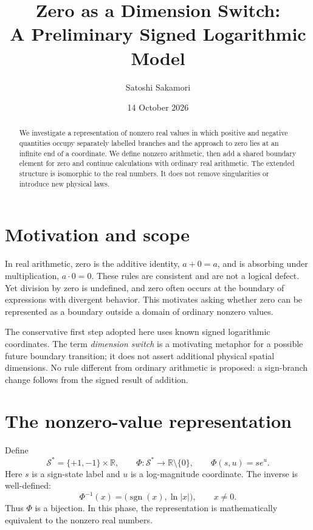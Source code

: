 \documentclass[11pt,a4paper]{article}
\title{Zero as a Dimension Switch:\\A Preliminary Signed Logarithmic Model}
\author{Satoshi Sakamori}
\date{14 October 2026}
\newcommand{\Sstar}{\mathcal{S}^{\ast}}
\newcommand{\R}{\mathbb{R}}
\begin{document}
\maketitle

\begin{abstract}
We investigate a representation of nonzero real values in which positive
and negative quantities occupy separately labelled branches and the
approach to zero lies at an infinite end of a coordinate. We define nonzero arithmetic, then add a shared boundary element for
zero and continue calculations with ordinary real arithmetic. The
extended structure is isomorphic to the real numbers. It does not
remove singularities or introduce new physical laws.
\end{abstract}

\section{Motivation and scope}

In real arithmetic, zero is the additive identity, $a+0=a$, and is
absorbing under multiplication, $a\cdot0=0$. These rules are consistent
and are not a logical defect. Yet division by zero is undefined, and
zero often occurs at the boundary of expressions with divergent behavior.
This motivates asking whether zero can be represented as a boundary
outside a domain of ordinary nonzero values.

The conservative first step adopted here uses known signed logarithmic
coordinates. The term \emph{dimension switch} is a motivating metaphor
for a possible future boundary transition; it does not assert additional
physical spatial dimensions. No rule different from ordinary arithmetic is proposed: a sign-branch
change follows from the signed result of addition.

\section{The nonzero-value representation}

Define
\begin{equation}
 \Sstar=\{+1,-1\}\times\R,\qquad
 \Phi:\Sstar\longrightarrow\R\setminus\{0\},\qquad
 \Phi(s,u)=s e^u.
 \label{eq:phi}
\end{equation}
Here $s$ is a sign-state label and $u$ is a log-magnitude coordinate.
The inverse is well-defined:
\begin{equation}
 \Phi^{-1}(x)=\bigl(\operatorname{sgn}(x),\ln|x|\bigr),
 \qquad x\ne0.
\end{equation}
Thus $\Phi$ is a bijection. In this phase, the representation is
mathematically equivalent to the nonzero real numbers.
\end{document}
